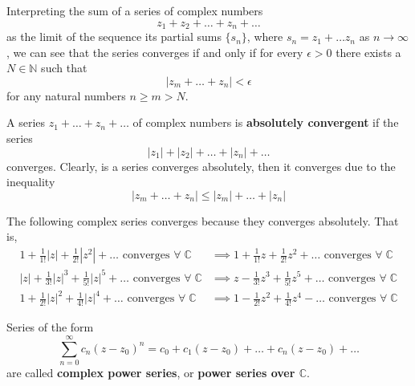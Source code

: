 \documentclass{article}
\begin{document}
    \begin{lemma}
      Interpreting the sum of a series of complex numbers
      \[z_1 + z_2 + \ldots + z_n + \ldots\]
      as the limit of the sequence its partial sums $\{s_n\}$, where $s_n = z_1 + \ldots z_n$ as $n \rightarrow \infty$, we can see that the series converges if and only if for every $\epsilon > 0$ there exists a $N \in \mathbb{N}$ such that 
      \[|z_m + \ldots + z_n| < \epsilon\]
      for any natural numbers $n \geq m > N$. 
    \end{lemma}

    \begin{definition}
      A series $z_1 + \ldots + z_n + \ldots$ of complex numbers is \textbf{absolutely convergent} if the series
      \[|z_1| + |z_2| + \ldots + |z_n| + \ldots\]
      converges. Clearly, is a series converges absolutely, then it converges due to the inequality
      \[|z_m + \ldots + z_n| \leq |z_m| + \ldots + |z_n|\]
    \end{definition}

    \begin{example}
      The following complex series converges because they converges absolutely. That is, 
      \begin{align*}
          1 + \frac{1}{1!}|z| + \frac{1}{2!}|z^2| + \ldots \text{ converges } \forall \; \mathbb{C} & \implies 1 + \frac{1}{1!}z + \frac{1}{2!}z^2 + \ldots \text{ converges } \forall \; \mathbb{C} \\
          |z| + \frac{1}{3!}|z|^3 + \frac{1}{5!}|z|^5 + \ldots \text{ converges } \forall \; \mathbb{C}  & \implies z - \frac{1}{3!} z^3 + \frac{1}{5!}z^5 + \ldots \text{ converges } \forall \; \mathbb{C} \\
          1 + \frac{1}{2!}|z|^2 + \frac{1}{4!} |z|^4 + \ldots \text{ converges }  \forall \; \mathbb{C} & \implies 1 - \frac{1}{2!}z^2 + \frac{1}{4!} z^4 - \ldots \text{ converges }  \forall \; \mathbb{C} 
      \end{align*}
    \end{example}

    \begin{definition}
      Series of the form 
      \[\sum_{n=0}^\infty c_n (z - z_0)^n = c_0 + c_1 (z - z_0) + \ldots + c_n (z - z_0) + \ldots\]
      are called \textbf{complex power series}, or \textbf{power series over $\mathbb{C}$}. 
    \end{definition}
\end{document}
